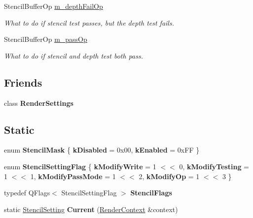 \begin{Indent}
\begin{DoxyCompactItemize}
Stencil\+Buffer\+Op \mbox{\hyperlink{classrev_1_1_stencil_setting_a68cac85a8e0011f8e9458c7bed7c4dd6}{m\+\_\+depth\+Fail\+Op}}
\begin{DoxyCompactList}\small\item\em What to do if stencil test passes, but the depth test fails. \end{DoxyCompactList}\item 
\mbox{\label{classrev_1_1_stencil_setting_a5c4626806672338764681b8e86eaf034}} 
Stencil\+Buffer\+Op \mbox{\hyperlink{classrev_1_1_stencil_setting_a5c4626806672338764681b8e86eaf034}{m\+\_\+pass\+Op}}
\begin{DoxyCompactList}\small\item\em What to do if stencil and depth test both pass. \end{DoxyCompactList}\end{DoxyCompactItemize}
\end{Indent}
\subsection*{Friends}
\begin{DoxyCompactItemize}
\item 
\mbox{\label{classrev_1_1_stencil_setting_abf433a9c39697ef25510a90f4cf565b0}} 
class {\bfseries Render\+Settings}
\end{DoxyCompactItemize}
\subsection*{Static}
\begin{DoxyCompactItemize}
\item 
\mbox{\label{classrev_1_1_stencil_setting_a98d03bf17ef6ea4f927695a755db116f}} 
enum {\bfseries Stencil\+Mask} \{ {\bfseries k\+Disabled} = 0x00, 
{\bfseries k\+Enabled} = 0x\+FF
 \}
\item 
\mbox{\label{classrev_1_1_stencil_setting_ad27afe84f0de441f6aec8990fc1e7d89}} 
enum {\bfseries Stencil\+Setting\+Flag} \{ {\bfseries k\+Modify\+Write} = 1 $<$$<$ 0, 
{\bfseries k\+Modify\+Testing} = 1 $<$$<$ 1, 
{\bfseries k\+Modify\+Pass\+Mode} = 1 $<$$<$ 2, 
{\bfseries k\+Modify\+Op} = 1 $<$$<$ 3
 \}
\item 
\mbox{\label{classrev_1_1_stencil_setting_ac4def23701010a769dcf7b940f1adb10}} 
typedef Q\+Flags$<$ Stencil\+Setting\+Flag $>$ {\bfseries Stencil\+Flags}
\item 
\mbox{\label{classrev_1_1_stencil_setting_a1c6a44f412895e5b059b28c26d95e146}} 
static \mbox{\hyperlink{classrev_1_1_stencil_setting}{Stencil\+Setting}} {\bfseries Current} (\mbox{\hyperlink{classrev_1_1_render_context}{Render\+Context}} \&context)
\end{DoxyCompactItemize}

